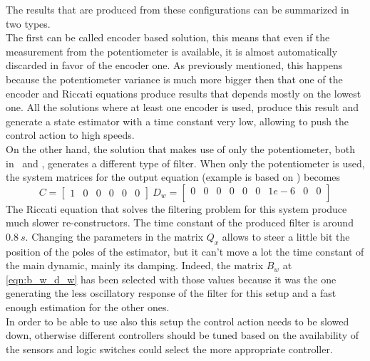The results that are produced from these configurations can be summarized in two types. \\ 

The first can be called encoder based solution, this means that even if the measurement from the potentiometer is available, it is almost automatically discarded in favor of the encoder one. As previously mentioned, this happens because the potentiometer variance is much more bigger then that one of the encoder and Riccati equations produce results that depends mostly on the lowest one. All the solutions where at least one encoder is used, produce this result and generate a state estimator with a time constant very low, allowing to push the control action to high speeds.\\

On the other hand, the solution that makes use of only the potentiometer, both in \onedof\ and \twodof, generates a different type of filter. When only the potentiometer is used, the system matrices for the output equation (example is based on \twodof) becomes 
\begin{equation}
	C = \begin{bmatrix}
		1 & 0 & 0 & 0 & 0 & 0
	\end{bmatrix} \
	D_w = \begin{bmatrix}
		0 & 0 & 0 & 0 & 0 & 0 & 1e-6 & 0 & 0 \\
	\end{bmatrix} 
\end{equation}
The Riccati equation that solves the filtering problem for this system produce much slower re-constructors. The time constant of the produced filter is around~$0.8\ s$. Changing the parameters in the matrix $Q_x$ allows to steer a little bit the position of the poles of the estimator, but it can't move a lot the time constant of the main dynamic, mainly its damping. Indeed, the matrix $B_w$ at \ref{eqn:b_w_d_w} has been selected with those values because it was the one generating the less oscillatory response of the filter for this setup and a fast enough estimation for the other ones.\\

In order to be able to use also this setup the control action needs to be slowed down, otherwise different controllers should be tuned based on the availability of the sensors and logic switches could select the more appropriate controller.\\

